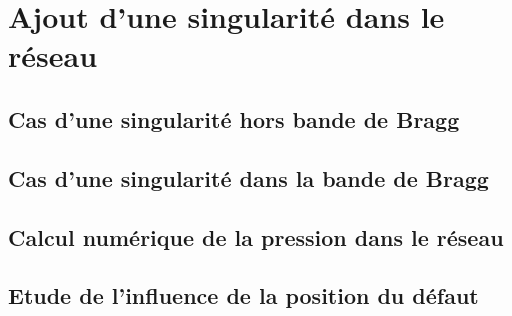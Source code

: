 \chapter{Ajout d'une singularité dans le réseau}

\section{Cas d'une singularité hors bande de Bragg}


\section{Cas d'une singularité dans la bande de Bragg}
\section{Calcul numérique de la pression dans le réseau}
\section{Etude de l'influence de la position du défaut}